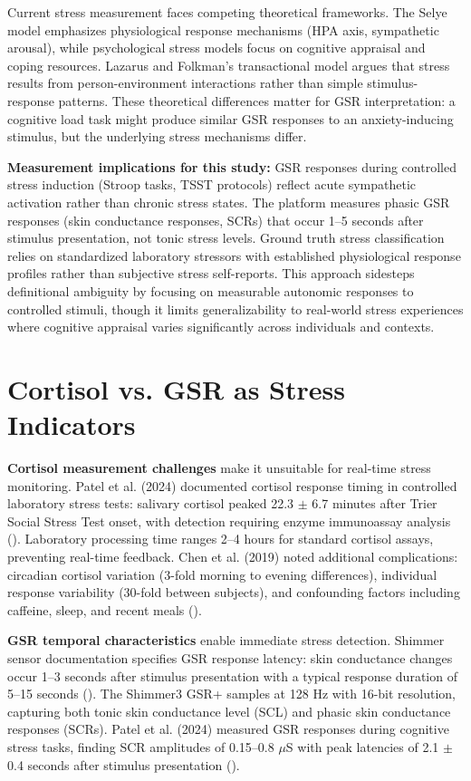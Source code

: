 Current stress measurement faces competing theoretical frameworks. The Selye model emphasizes physiological response mechanisms (HPA axis, sympathetic arousal), while psychological stress models focus on cognitive appraisal and coping resources. Lazarus and Folkman's transactional model argues that stress results from person-environment interactions rather than simple stimulus-response patterns. These theoretical differences matter for GSR interpretation: a cognitive load task might produce similar GSR responses to an anxiety-inducing stimulus, but the underlying stress mechanisms differ.

\textbf{Measurement implications for this study:} GSR responses during controlled stress induction (Stroop tasks, TSST protocols) reflect acute sympathetic activation rather than chronic stress states. The platform measures phasic GSR responses (skin conductance responses, SCRs) that occur 1--5 seconds after stimulus presentation, not tonic stress levels. Ground truth stress classification relies on standardized laboratory stressors with established physiological response profiles rather than subjective stress self-reports. This approach sidesteps definitional ambiguity by focusing on measurable autonomic responses to controlled stimuli, though it limits generalizability to real-world stress experiences where cognitive appraisal varies significantly across individuals and contexts.

\section{Cortisol vs. GSR as Stress Indicators}
\textbf{Cortisol measurement challenges} make it unsuitable for real-time stress monitoring. Patel et al. (2024) documented cortisol response timing in controlled laboratory stress tests: salivary cortisol peaked 22.3 $\pm$ 6.7 minutes after Trier Social Stress Test onset, with detection requiring enzyme immunoassay analysis (\citep{ref7}). Laboratory processing time ranges 2--4 hours for standard cortisol assays, preventing real-time feedback. Chen et al. (2019) noted additional complications: circadian cortisol variation (3-fold morning to evening differences), individual response variability (30-fold between subjects), and confounding factors including caffeine, sleep, and recent meals (\citep{ref4}).

\textbf{GSR temporal characteristics} enable immediate stress detection. Shimmer sensor documentation specifies GSR response latency: skin conductance changes occur 1--3 seconds after stimulus presentation with a typical response duration of 5--15 seconds (\citep{ref8}). The Shimmer3 GSR+ samples at 128 Hz with 16-bit resolution, capturing both tonic skin conductance level (SCL) and phasic skin conductance responses (SCRs). Patel et al. (2024) measured GSR responses during cognitive stress tasks, finding SCR amplitudes of 0.15--0.8 $\mu$S with peak latencies of 2.1 $\pm$ 0.4 seconds after stimulus presentation (\citep{ref7}).

